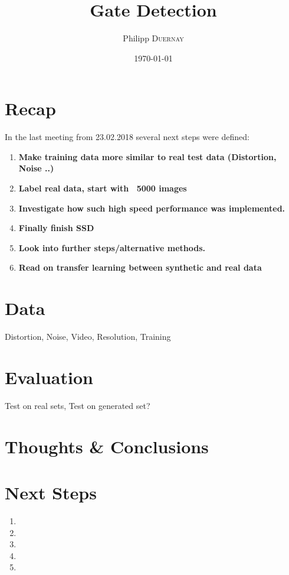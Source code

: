 \documentclass{article}
\title{Gate Detection} %
\author{Philipp \textsc{Duernay}} %
\date{\today} %
\begin{document}
\maketitle


\section{Recap}
In the last meeting from 23.02.2018 several next steps were defined:
\begin{enumerate}
	\item \textbf{Make training data more similar to real test data (Distortion, Noise ..)}
	\item \textbf{Label real data, start with ~5000 images}
	\item \textbf{Investigate how such high speed performance was implemented.}
	\item \textbf{Finally finish SSD}
	\item \textbf{Look into further steps/alternative methods.}
	\item \textbf{Read on transfer learning between synthetic and real data}
\end{enumerate}

\section{Data}

Distortion, Noise, Video, Resolution, Training

\section{Evaluation}

Test on real sets, Test on generated set?

\section{Thoughts \& Conclusions}



\section{Next Steps}
\begin{enumerate}
		\item 
		\item 
		\item
		\item 
		\item 
\end{enumerate}
\end{document}
